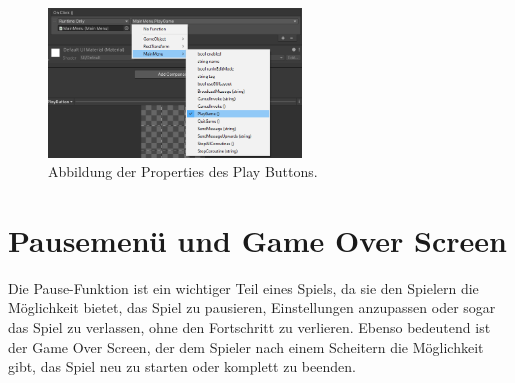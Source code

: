 \begin{figure}[H]
    \centering
    \includegraphics[width=0.6\textwidth]{chapters/03/images/PlayButton.png}
    \caption{Abbildung der Properties des Play Buttons.}
    \label{htl05}
\end{figure}

\section{Pausemenü und Game Over Screen}


Die Pause-Funktion ist ein wichtiger Teil eines Spiels, da sie den Spielern die Möglichkeit bietet, das Spiel zu pausieren, Einstellungen anzupassen oder sogar das Spiel zu verlassen, ohne den Fortschritt zu verlieren. Ebenso bedeutend ist der Game Over Screen, der dem Spieler nach einem Scheitern die Möglichkeit gibt, das Spiel neu zu starten oder komplett zu beenden.

